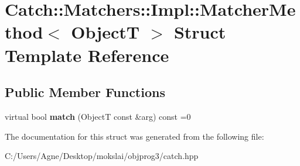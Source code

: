 \hypertarget{struct_catch_1_1_matchers_1_1_impl_1_1_matcher_method}{}\section{Catch\+:\+:Matchers\+:\+:Impl\+:\+:Matcher\+Method$<$ ObjectT $>$ Struct Template Reference}
\label{struct_catch_1_1_matchers_1_1_impl_1_1_matcher_method}
\subsection*{Public Member Functions}
\begin{DoxyCompactItemize}
\item 
\mbox{\label{struct_catch_1_1_matchers_1_1_impl_1_1_matcher_method_ae0920ff9e817acf08e1bb0cbcb044e30}} 
virtual bool {\bfseries match} (ObjectT const \&arg) const =0
\end{DoxyCompactItemize}


The documentation for this struct was generated from the following file\+:\begin{DoxyCompactItemize}
\item 
C\+:/\+Users/\+Agne/\+Desktop/mokslai/objprog3/catch.\+hpp\end{DoxyCompactItemize}
